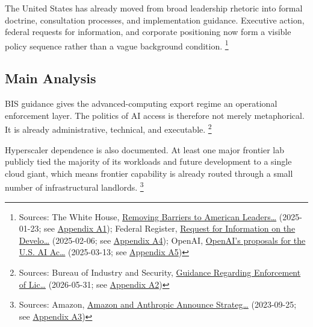 \documentclass[
  american,
  11pt,
  letterpaper,
]{article}
\begin{document}
The United States has already moved from broad leadership rhetoric into
formal doctrine, consultation processes, and implementation guidance.
Executive action, federal requests for information, and corporate
positioning now form a visible policy sequence rather than a vague
background condition. \footnote{Sources: The White House,
  \href{https://www.whitehouse.gov/presidential-actions/2025/01/removing-barriers-to-american-leadership-in-artificial-intelligence/}{Removing
  Barriers to American Leaders\ldots{}} (2025-01-23; see
  \hyperref[ch-07-appendix-a1-removing-barriers-to-american-leadership-in-artificial-intelligence]{Appendix
  A1}); Federal Register,
  \href{https://www.federalregister.gov/documents/2025/02/06/2025-02305/request-for-information-on-the-development-of-an-artificial-intelligence-ai-action-plan}{Request
  for Information on the Develo\ldots{}} (2025-02-06; see
  \hyperref[ch-07-appendix-a4-request-for-information-on-the-development-of-an-artificial-intelligence-ai-action-plan]{Appendix
  A4}); OpenAI,
  \href{https://openai.com/global-affairs/openai-proposals-for-the-us-ai-action-plan/}{OpenAI's
  proposals for the U.S. AI Ac\ldots{}} (2025-03-13; see
  \hyperref[ch-07-appendix-a5-openais-proposals-for-the-us-ai-action-plan]{Appendix
  A5})}

\subsection{Main Analysis}\label{main-analysis-7}

BIS guidance gives the advanced-computing export regime an operational
enforcement layer. The politics of AI access is therefore not merely
metaphorical. It is already administrative, technical, and executable.
\footnote{Sources: Bureau of Industry and Security,
  \href{https://www.bis.gov/media/documents/bis-guidance-may-31-2026.pdf}{Guidance
  Regarding Enforcement of Lic\ldots{}} (2026-05-31; see
  \hyperref[ch-07-appendix-a2-guidance-regarding-enforcement-of-license-requirements-for-advanced-computing-items-for-entities-headquartered-in-country-group-d-5-and-macau]{Appendix
  A2})}

Hyperscaler dependence is also documented. At least one major frontier
lab publicly tied the majority of its workloads and future development
to a single cloud giant, which means frontier capability is already
routed through a small number of infrastructural landlords. \footnote{Sources:
  Amazon,
  \href{https://press.aboutamazon.com/2023/9/amazon-and-anthropic-announce-strategic-collaboration-to-advance-generative-ai}{Amazon
  and Anthropic Announce Strateg\ldots{}} (2023-09-25; see
  \hyperref[ch-07-appendix-a3-amazon-and-anthropic-announce-strategic-collaboration-to-advance-generative-ai]{Appendix
  A3})}
\end{document}
